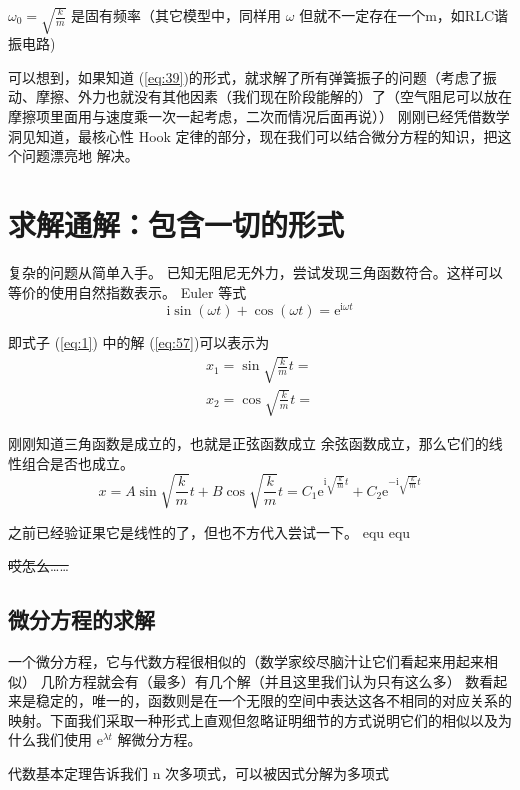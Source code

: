 \documentclass[11pt]{book}
\begin{document}
\(\omega_0=\sqrt{\frac{k}{m}}\) 是固有频率（其它模型中，同样用 \(\omega\) 但就不一定存在一个m，如RLC谐振电路)

可以想到，如果知道
(\ref{eq:39})的形式，就求解了所有弹簧振子的问题（考虑了振动、摩擦、外力也就没有其他因素（我们现在阶段能解的）了（空气阻尼可以放在摩擦项里面用与速度乘一次一起考虑，二次而情况后面再说））
刚刚已经凭借数学洞见知道，最核心性 Hook 定律的部分，现在我们可以结合微分方程的知识，把这个问题漂亮地
解决。

\section{求解通解：包含一切的形式}
\label{sec:orgcd9f6d6}

复杂的问题从简单入手。
已知无阻尼无外力，尝试发现三角函数符合。这样可以等价的使用自然指数表示。
Euler 等式
\begin{equation}
\label{eq:58}
\mathrm{i}\sin(\omega t)+\cos(\omega t)=\mathrm{e}^{\mathrm{i}\omega t}
\end{equation}

即式子
(\ref{eq:1})
中的解
(\ref{eq:57})可以表示为
\begin{equation}
\label{eq:59}
\begin{split}
x_1=\sin \sqrt{\frac{k}{m}}t=\\
x_2=\cos \sqrt{\frac{k}{m}}t=
\end{split}
\end{equation}

刚刚知道三角函数是成立的，也就是正弦函数成立
余弦函数成立，那么它们的线性组合是否也成立。
$$x=A\sin \sqrt{\frac{k}{m}}t+B\cos \sqrt{\frac{k}{m}}t=C_1\mathrm{e}^{\mathrm{i}\sqrt{\frac{k}{m}}t}+C_2\mathrm{e}^{-\mathrm{i}\sqrt{\frac{k}{m}}t}$$

之前已经验证果它是线性的了，但也不方代入尝试一下。
equ
equ

\sout{哎怎么……}
\subsection{微分方程的求解}
\label{sec:orgcedf583}
一个微分方程，它与代数方程很相似的（数学家绞尽脑汁让它们看起来用起来相似）
几阶方程就会有（最多）有几个解（并且这里我们认为只有这么多）
数看起来是稳定的，唯一的，函数则是在一个无限的空间中表达这各不相同的对应关系的映射。下面我们采取一种形式上直观但忽略证明细节的方式说明它们的相似以及为什么我们使用 \(\mathrm{e}^{\lambda t}\) 解微分方程。

代数基本定理告诉我们 n 次多项式，可以被因式分解为多项式
\end{document}
